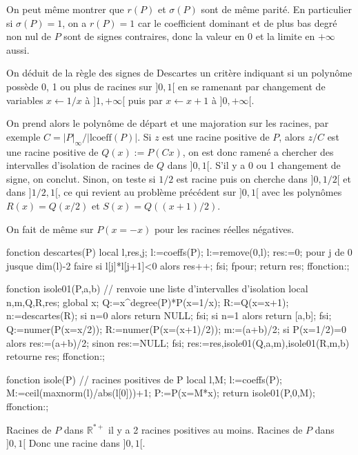 \documentclass[a4paper,11pt]{book}
\begin{document}
\begin{giacjshere}
\begin{itemize}
On peut m\^eme montrer que $r(P)$ et $\sigma(P)$ sont de m\^eme
parit\'e. En particulier si $\sigma(P)=1$, on a $r(P)=1$ car
le coefficient dominant et de plus bas degr\'e non nul de $P$ sont
de signes contraires, donc la valeur en 0 et la limite en $+\infty$
aussi.

On d\'eduit de la r\`egle des signes de Descartes
un crit\`ere indiquant si un polyn\^ome poss\`ede 0, 1 ou 
plus de racines sur $]0,1[$ en se ramenant par changement de variables 
$x \leftarrow 1/x$ \`a $]1,+\infty[$ puis par $x \leftarrow x+1$
\`a $]0,+\infty[$. 

On prend alors le polyn\^ome de d\'epart et une majoration
sur les racines, par exemple $C=|P|_{\infty}/|\mbox{lcoeff}(P)|$. Si $z$
est une racine positive de $P$, alors $z/C$ est une racine positive
de $Q(x):=P(Cx)$, on est donc ramen\'e a chercher des intervalles
d'isolation de racines de $Q$ dans $]0,1[$. S'il y a 0 ou 1 changement
de signe, on conclut. Sinon, on teste si $1/2$ est racine
puis on cherche dans $]0,1/2[$ et dans $]1/2,1[$, ce qui
revient au probl\`eme pr\'ec\'edent sur $]0,1[$
avec les polyn\^omes $R(x)=Q(x/2)$ et $S(x)=Q((x+1)/2)$.

On fait de m\^eme sur $P(x=-x)$ pour les racines r\'eelles n\'egatives.
\begin{giacprog}
fonction descartes(P)
  local l,res,j;
  l:=coeffs(P);
  l:=remove(0,l);
  res:=0;
  pour j de 0 jusque dim(l)-2 faire
    si l[j]*l[j+1]<0 alors res++; fsi;
  fpour;
  return res;
ffonction:;
  
fonction isole01(P,a,b)
  // renvoie une liste d'intervalles d'isolation
  local n,m,Q,R,res;
  global x;
  Q:=x^degree(P)*P(x=1/x);
  R:=Q(x=x+1);
  n:=descartes(R);
  si n=0 alors return NULL; fsi;
  si n=1 alors return [a,b]; fsi;
  Q:=numer(P(x=x/2));
  R:=numer(P(x=(x+1)/2));
  m:=(a+b)/2;
  si P(x=1/2)=0 alors res:=(a+b)/2; sinon res:=NULL; fsi;
  res:=res,isole01(Q,a,m),isole01(R,m,b)
  retourne res;
ffonction:;

fonction isole(P) // racines positives de P
  local l,M;
  l:=coeffs(P);
  M:=ceil(maxnorm(l)/abs(l[0]))+1;
  P:=P(x=M*x);
  return isole01(P,0,M);
ffonction:;
\end{giacprog}
Racines de $P$ dans $\mathbb{R}^{*+}$
il y a 2 racines positives au moins.
Racines de $P$ dans $]0,1[$
Donc une racine dans $]0,1[$.


\end{itemize}
\end{giacjshere}
\end{document}
